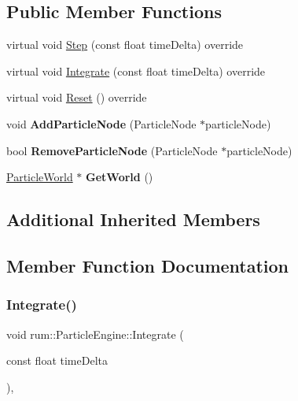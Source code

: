 \subsection*{Public Member Functions}
\begin{DoxyCompactItemize}
\item 
virtual void \hyperlink{classrum_1_1_particle_engine_ac25c2f442c5ca9ace806384797cbe0a6}{Step} (const float time\+Delta) override
\item 
virtual void \hyperlink{classrum_1_1_particle_engine_a7b3f0cc43054fb7a6367cf082543396e}{Integrate} (const float time\+Delta) override
\item 
virtual void \hyperlink{classrum_1_1_particle_engine_af1249c80ca75209f08b88f76b94a60f9}{Reset} () override
\item 
\mbox{\label{classrum_1_1_particle_engine_a4f6d10f807ee41f424739d777147967a}} 
void {\bfseries Add\+Particle\+Node} (Particle\+Node $\ast$particle\+Node)
\item 
\mbox{\label{classrum_1_1_particle_engine_a9156915ba5a1cd59e7f9fd68095da07c}} 
bool {\bfseries Remove\+Particle\+Node} (Particle\+Node $\ast$particle\+Node)
\item 
\mbox{\label{classrum_1_1_particle_engine_a39ff2aaad1ddf86edf636dd6321f88b2}} 
\hyperlink{classrum_1_1_particle_world}{Particle\+World} $\ast$ {\bfseries Get\+World} ()
\end{DoxyCompactItemize}
\subsection*{Additional Inherited Members}


\subsection{Member Function Documentation}
\mbox{\label{classrum_1_1_particle_engine_a7b3f0cc43054fb7a6367cf082543396e}} 
\subsubsection{\texorpdfstring{Integrate()}{Integrate()}}
{\footnotesize\ttfamily void rum\+::\+Particle\+Engine\+::\+Integrate (\begin{DoxyParamCaption}\item[{const float}]{time\+Delta }\end{DoxyParamCaption})\hspace{0.3cm}{\ttfamily [override]}, {\ttfamily [virtual]}}


